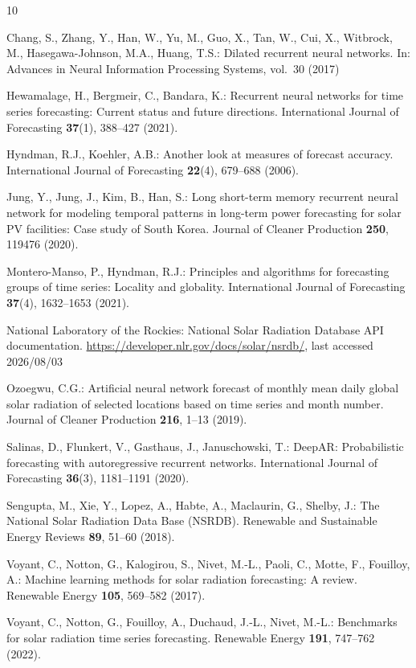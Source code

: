 \documentclass[runningheads]{llncs}
\begin{document}
\begin{thebibliography}{10}

Chang, S., Zhang, Y., Han, W., Yu, M., Guo, X., Tan, W., Cui, X., Witbrock, M., Hasegawa-Johnson, M.A., Huang, T.S.:
Dilated recurrent neural networks. In: Advances in Neural Information Processing Systems, vol.~30 (2017)

Hewamalage, H., Bergmeir, C., Bandara, K.:
Recurrent neural networks for time series forecasting: Current status and future directions. International Journal of Forecasting \textbf{37}(1), 388--427 (2021). 

Hyndman, R.J., Koehler, A.B.:
Another look at measures of forecast accuracy. International Journal of Forecasting \textbf{22}(4), 679--688 (2006). 

Jung, Y., Jung, J., Kim, B., Han, S.:
Long short-term memory recurrent neural network for modeling temporal patterns in long-term power forecasting for solar PV facilities: Case study of South Korea. Journal of Cleaner Production \textbf{250}, 119476 (2020). 

Montero-Manso, P., Hyndman, R.J.:
Principles and algorithms for forecasting groups of time series: Locality and globality. International Journal of Forecasting \textbf{37}(4), 1632--1653 (2021). 

National Laboratory of the Rockies:
National Solar Radiation Database API documentation. \url{https://developer.nlr.gov/docs/solar/nsrdb/}, last accessed 2026/08/03

Ozoegwu, C.G.:
Artificial neural network forecast of monthly mean daily global solar radiation of selected locations based on time series and month number. Journal of Cleaner Production \textbf{216}, 1--13 (2019). 

Salinas, D., Flunkert, V., Gasthaus, J., Januschowski, T.:
DeepAR: Probabilistic forecasting with autoregressive recurrent networks. International Journal of Forecasting \textbf{36}(3), 1181--1191 (2020). 

Sengupta, M., Xie, Y., Lopez, A., Habte, A., Maclaurin, G., Shelby, J.:
The National Solar Radiation Data Base (NSRDB). Renewable and Sustainable Energy Reviews \textbf{89}, 51--60 (2018). 

Voyant, C., Notton, G., Kalogirou, S., Nivet, M.-L., Paoli, C., Motte, F., Fouilloy, A.:
Machine learning methods for solar radiation forecasting: A review. Renewable Energy \textbf{105}, 569--582 (2017). 

Voyant, C., Notton, G., Fouilloy, A., Duchaud, J.-L., Nivet, M.-L.:
Benchmarks for solar radiation time series forecasting. Renewable Energy \textbf{191}, 747--762 (2022). 

\end{thebibliography}
\end{document}
